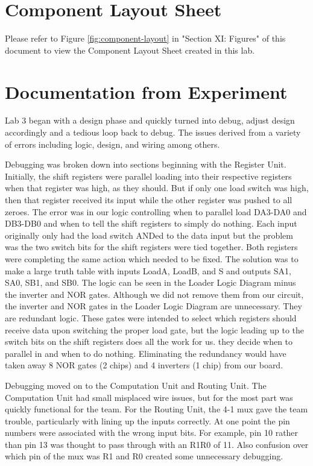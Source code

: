 \documentclass[journal, twocolumn, final,11pt,letterpaper]{IEEEtran}
\begin{document}
\section{Component Layout Sheet}
Please refer to Figure \ref{fig:component-layout} in "Section XI: Figures" of this document to view the Component Layout Sheet created in this lab.

\section{Documentation from Experiment}
Lab 3 began with a design phase and quickly turned into debug, adjust design accordingly and a tedious loop back to debug.  The issues derived from a variety of errors including logic, design, and wiring among others. 

Debugging was broken down into sections beginning with the Register Unit.  Initially, the shift registers were parallel loading into their respective registers when that register was high, as they should. But if only one load switch was high, then that register received its input while the other register was pushed to all zeroes.  The error was in our logic controlling when to parallel load DA3-DA0 and DB3-DB0 and when to tell the shift registers to simply do nothing.  Each input originally only had the load switch ANDed to the data input but the problem was the two switch bits for the shift registers were tied together.  Both registers were completing the same action which needed to be fixed.  The solution was to make a large truth table with inputs LoadA, LoadB, and S and outputs SA1, SA0, SB1, and SB0.  The logic can be seen in the Loader Logic Diagram minus the inverter and NOR gates.  Although we did not remove them from our circuit, the inverter and NOR gates in the Loader Logic Diagram are unnecessary.  They are redundant logic. These gates were intended to select which registers should receive data upon switching the proper load gate, but the logic leading up to the switch bits on the shift registers does all the work for us.  they decide when to parallel in and when to do nothing.  Eliminating the redundancy would have taken away 8 NOR gates (2 chips) and 4 inverters (1 chip) from our board.  

Debugging moved on to the Computation Unit and Routing Unit.  The Computation Unit had small misplaced wire issues, but for the most part was quickly functional for the team.  For the Routing Unit, the 4-1 mux gave the team trouble, particularly with lining up the inputs correctly.  At one point the pin numbers were associated with the wrong input bits.  For example, pin 10 rather than pin 13 was thought to pass through with an R1R0 of 11.  Also confusion over which pin of the mux was R1 and R0 created some unnecessary debugging.
\end{document}
